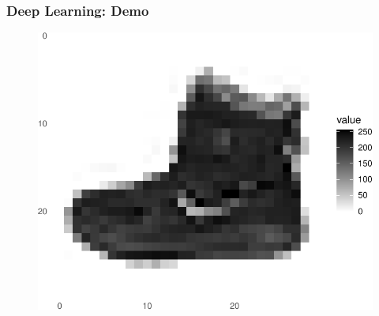 \documentclass[
  shownotes,
  xcolor={svgnames},
  hyperref={colorlinks,citecolor=DarkBlue,linkcolor=DarkRed,urlcolor=DarkBlue}
  , aspectratio=169]{beamer}
\begin{document}
\begin{frame}[fragile]
\frametitle{Deep Learning: Demo}
  \begin{figure}[H] \centering
            \captionsetup{justification=centering}
              \includegraphics[scale=0.4]{figures/unnamed-chunk-3-1.pdf}
              
 \end{figure}


\end{frame}
\end{document}
